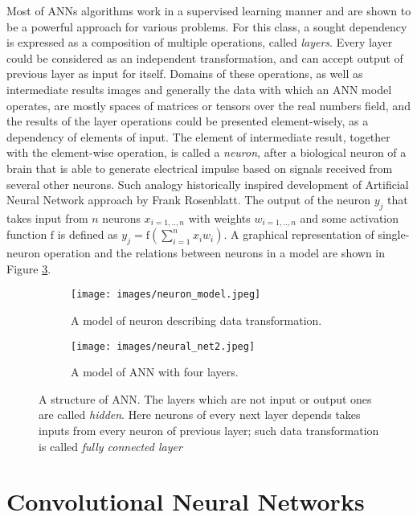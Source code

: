 Most of ANNs algorithms work in a supervised learning manner and are shown to be a powerful approach for various problems.\cite{}
For this class, a sought dependency is expressed as a composition of multiple operations, called \emph{layers}.
Every layer could be considered as an independent transformation, and can accept output of previous layer as input for itself.
Domains of these operations, as well as intermediate results images and generally the data with which an ANN model operates, are mostly spaces of matrices or tensors over the real numbers field, and the results of the layer operations could be presented element-wisely, as a dependency of elements of input.
The element of intermediate result, together with the element-wise operation, is called a \emph{neuron}, after a biological neuron of a brain that is able to generate electrical impulse based on signals received from several other neurons. 
Such analogy historically inspired development of Artificial Neural Network approach by Frank Rosenblatt\cite{}.
The output of the neuron $y_{j}$ that takes input from $n$ neurons $x_{i=1,..,n}$ with weights $w_{i=1,..,n}$ and some activation function $\mathrm{f}$ is defined as $ y_{j}=\mathrm{f}(\sum_{i=1}^{n} x_{i}w_{i})$.
A graphical representation of single-neuron operation and the relations between neurons in a model are shown in Figure \ref{fig:nngen}.
\medskip
\begin{figure}[h]
\begin{subfigure}[b]{0.6\linewidth}
	\texttt{[image: images/neuron\_model.jpeg]}
	\caption{A model of neuron describing data transformation.}
	\label{fig:neuron1}
\end{subfigure}
\begin{subfigure}[b]{0.4\linewidth}
	\texttt{[image: images/neural\_net2.jpeg]}
	\caption{A model of ANN with four layers. }
	\label{fig:neuron2}
\end{subfigure}
\caption{A structure of ANN. The layers which are not input or output ones are called \emph{hidden}. Here neurons of every next layer depends takes inputs from every neuron of previous layer; such data transformation is called \emph{fully connected layer}}
\label{fig:nngen}
\end{figure}


\section{Convolutional Neural Networks}

